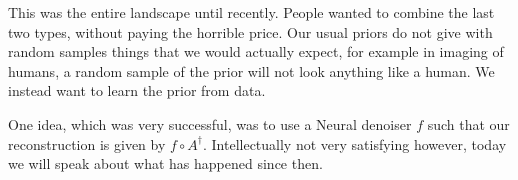 \documentclass[12pt]{article}
\begin{document}
This was the entire landscape until recently. People wanted to combine the last two types, without paying the horrible price. Our usual priors do not give with random samples things that we would actually expect, for example in imaging of humans, a random sample of the prior will not look anything like a human. We instead want to learn the prior from data.

One idea, which was very successful, was to use a Neural denoiser $f$ such that our reconstruction is given by $f\circ A^\dagger$. Intellectually not very satisfying however, today we will speak about what has happened since then.
\end{document}
